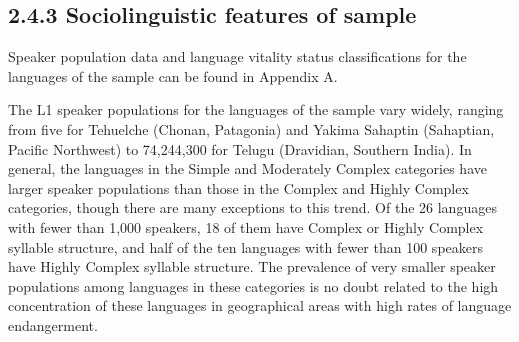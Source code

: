 \subsection{2.4.3 Sociolinguistic features of sample}

  Speaker population data and language vitality status classifications for the languages of the sample can be found in Appendix A.



  The L1 speaker populations for the languages of the sample vary widely, ranging from five for Tehuelche (Chonan, Patagonia) and Yakima Sahaptin (Sahaptian, Pacific Northwest) to 74,244,300 for Telugu (Dravidian, Southern India). In general, the languages in the Simple and Moderately Complex categories have larger speaker populations than those in the Complex and Highly Complex categories, though there are many exceptions to this trend. Of the 26 languages with fewer than 1,000 speakers, 18 of them have Complex or Highly Complex syllable structure, and half of the ten languages with fewer than 100 speakers have Highly Complex syllable structure. The prevalence of very smaller speaker populations among languages in these categories is no doubt related to the high concentration of these languages in geographical areas with high rates of language endangerment.



